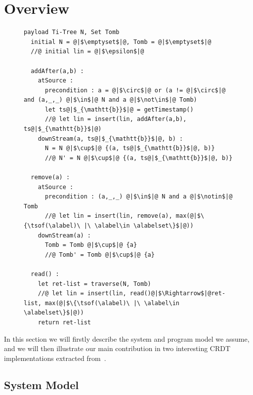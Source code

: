 \section{Overview}
\label{sec:overview}


\begin{figure}[t]
\begin{lstlisting}[caption={Replicated Growing Array (RGA) CRDT pseudo-code (adapted from~\cite{ShapiroPBZ11})},captionpos=b,label={lst:rga}]
  payload Ti-Tree N, Set Tomb
  initial N = @|$\emptyset$|@, Tomb = @|$\emptyset$|@
  //@ initial lin = @|$\epsilon$|@

  addAfter(a,b) :
    atSource :
      precondition : a = @|$\circ$|@ or (a != @|$\circ$|@ and (a,_,_) @|$\in$|@ N and a @|$\not\in$|@ Tomb)
      let ts@|$_{\mathtt{b}}$|@ = getTimestamp()
      //@ let lin = insert(lin, addAfter(a,b), ts@|$_{\mathtt{b}}$|@)
    downStream(a, ts@|$_{\mathtt{b}}$|@, b) :
      N = N @|$\cup$|@ {(a, ts@|$_{\mathtt{b}}$|@, b)}
      //@ N' = N @|$\cup$|@ {(a, ts@|$_{\mathtt{b}}$|@, b)}

  remove(a) :
    atSource :
      precondition : (a,_,_) @|$\in$|@ N and a @|$\notin$|@ Tomb
      //@ let lin = insert(lin, remove(a), max(@|$\{\tsof(\alabel)\ |\ \alabel\in \alabelset\}$|@))
    downStream(a) :
      Tomb = Tomb @|$\cup$|@ {a}
      //@ Tomb' = Tomb @|$\cup$|@ {a}

  read() :
    let ret-list = traverse(N, Tomb)
    //@ let lin = insert(lin, read()@|$\Rightarrow$|@ret-list, max(@|$\{\tsof(\alabel)\ |\ \alabel\in \alabelset\}$|@))
    return ret-list
\end{lstlisting}
\end{figure}

In this section we will firstly describe the system and program model
we assume, and we will then illustrate our main contribution in two
interesting CRDT implementations extracted from~\cite{ShapiroPBZ11}.

\subsection{System Model}
\label{sec:sys-model}

